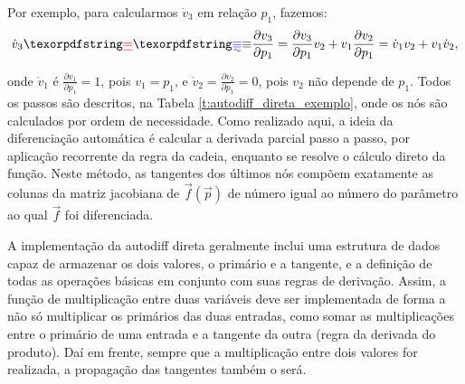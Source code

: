       \DIFaddbegin \noindent {}\DIFaddend Por exemplo, para calcularmos $\dot{v}_3$ \DIFaddbegin {}\DIFaddend em relação \DIFdelbegin {}\DIFdelend \DIFaddbegin {}\DIFaddend $p_1$\DIFdelbegin {}\DIFdelend , \DIFaddbegin {}\DIFaddend fazemos:
      \begin{equation} \label{e:autodiff_direta_tangente_exemplo}
        \dot{v}_3 \DIFdelbegin \DIFdel{=
        }\DIFdelend \DIFaddbegin \DIFadd{\equiv
        }\DIFaddend \frac{\partial v_3}{\partial p_1} =
        \frac{\partial v_3}{\partial p_1} v_2
          + v_1 \frac{\partial v_2}{\partial p_1} =
        \dot{v}_1 v_2 + v_1 \dot{v}_2
        ,
      \end{equation}

      \noindent onde $\dot{v}_1$ é $\frac{\partial v_1}{\partial p_1} = 1$, pois $v_1 = p_1$, e $\dot{v}_2 = \frac{\partial v_2}{\partial p_1} = 0$, pois $v_2$ não depende de $p_1$. Todos os passos \DIFdelbegin {}\DIFdelend \DIFaddbegin {}\DIFaddend são descritos, \DIFdelbegin {}\DIFdelend na Tabela \ref{t:autodiff_direta_exemplo}, onde os nós são calculados por ordem de necessidade. Como realizado aqui, a ideia da diferenciação automática é calcular a derivada parcial passo a passo, por aplicação recorrente da regra da cadeia, enquanto se resolve o cálculo direto da função. Neste método, as tangentes dos últimos nós compõem exatamente as colunas da matriz jacobiana de $\vec{f}(\vec{p})$ de número igual ao número do parâmetro ao qual $\vec{f}$ foi diferenciada.

      A implementação da autodiff direta geralmente inclui uma estrutura de dados capaz de armazenar os dois valores, o primário e a tangente, e a definição de todas as operações básicas em conjunto com suas regras de derivação. Assim, a função de multiplicação entre duas variáveis deve ser implementada de forma a não só multiplicar os primários das duas entradas, como somar as multiplicações entre o primário de uma entrada e a tangente da outra (regra da derivada do produto). Daí em frente, sempre que a multiplicação entre dois valores for realizada, a propagação das tangentes também o será.

